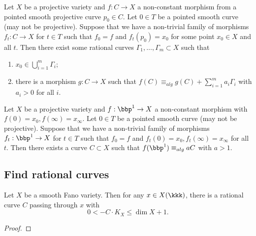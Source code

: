     \begin{proposition}\label{prop:deformation_of_curves_to_rational}
        Let \(X\) be a projective variety and \(f:C\to X\) a non-constant morphism from a pointed smooth projective curve \(p_0 \in C\).
        Let \(0 \in T\) be a pointed smooth curve (may not be projective).
        Suppose that we have a non-trivial family of morphisms \(f_t: C \to X\) for \(t \in T\) such that \(f_0 = f\) and \(f_t(p_0) = x_0\) for some point \(x_0 \in X\) and all \(t\).
        Then there exist some rational curves \(\Gamma_1, \ldots, \Gamma_m \subset X\) such that 
        \begin{enumerate}
            \item \(x_0 \in \bigcup_{i=1}^m \Gamma_i\);
            \item there is a morphism \(g: C \to X\) such that \(f(C) \equiv_{alg} g(C) + \sum_{i=1}^m a_i\Gamma_i\) with \(a_i > 0\) for all \(i\).
        \end{enumerate}
    \end{proposition}

    \begin{proposition}\label{prop:deformation_of_rational_curves_to_lower_degree}
        Let \(X\) be a projective variety and \(f:\bbp^1 \to X\) a non-constant morphism with \(f(0) = x_0, f(\infty) = x_\infty\).
        Let \(0 \in T\) be a pointed smooth curve (may not be projective).
        Suppose that we have a non-trivial family of morphisms \(f_t: \bbp^1 \to X\) for \(t \in T\) such that \(f_0 = f\) and \(f_t(0) = x_0, f_t(\infty) = x_\infty\) for all \(t\).
        Then there exists a curve \(C \subset X\) such that \(f(\bbp^1) \equiv_{alg} a C\) with \(a>1\).
    \end{proposition}

\subsection{Find rational curves}

    \begin{theorem}\label{thm:rational_curve_on_smooth_fano}
        Let \(X\) be a smooth Fano variety.
        Then for any \(x \in X(\kkk)\), there is a rational curve \(C\) passing through \(x\) with 
        \[ 0 < - C \cdot K_X \leq \dim X + 1. \]
    \end{theorem}
    \begin{proof}
    \end{proof}

